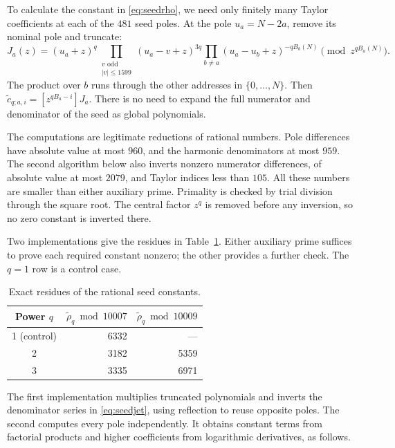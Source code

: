 \documentclass[11pt]{article}
\begin{document}
To calculate the constant in \eqref{eq:seedrho}, we need only finitely
many Taylor coefficients at each of the $481$ seed poles. At the pole
$u_a=N-2a$, remove its nominal pole and truncate:
\begin{equation}\label{eq:seedjet}
 J_a(z)=(u_a+z)^q\prod_{\substack{v\text{ odd}\\|v|\le1599}}
                (u_a-v+z)^{3q}
       \prod_{b\ne a}(u_a-u_b+z)^{-qB_b(N)}
       \pmod {z^{qB_a(N)}}.
\end{equation}
The product over $b$ runs through the other addresses in $\{0,\ldots,N\}$.
Then $\widetilde c_{q;a,i}=[z^{qB_a-i}]J_a$. There is no need to expand
the full numerator and denominator of the seed as global polynomials.

The computations are legitimate reductions of rational numbers.
Pole differences have absolute value at most $960$, and the harmonic
denominators at most $959$. The second algorithm below also inverts
nonzero numerator differences, of absolute value at most $2079$, and
Taylor indices less than $105$. All these numbers are smaller than
either auxiliary prime. Primality is checked by trial division through
the square root. The central factor $z^q$ is removed before any
inversion, so no zero constant is inverted there.

Two implementations give the residues in Table~\ref{tab:seeds}.
Either auxiliary prime suffices to prove each required constant nonzero;
the other provides a further check. The $q=1$ row is a control case.
\begin{table}[ht]
\centering
\begin{tabular}{crr}\toprule
Power $q$ & $\widetilde\rho_q\bmod10007$ & $\widetilde\rho_q\bmod10009$\\\midrule
1 (control) & 6332 & ---\\
2 & 3182 & 5359\\
3 & 3335 & 6971\\\bottomrule
\end{tabular}
\caption{Exact residues of the rational seed constants.}
\label{tab:seeds}
\end{table}

The first implementation multiplies truncated polynomials and inverts
the denominator series in \eqref{eq:seedjet}, using reflection to reuse
opposite poles. The second computes every pole independently. It obtains
constant terms from factorial products and higher coefficients from
logarithmic derivatives, as follows.
\end{document}
